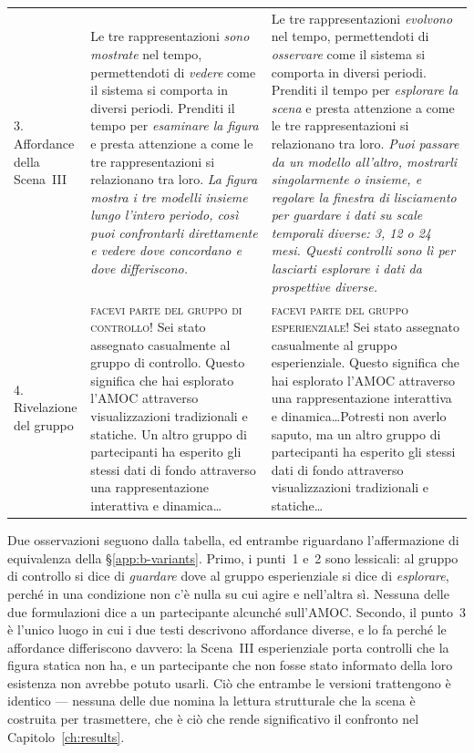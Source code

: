\begin{table}[tbp]
\begin{tabularx}{\textwidth}{@{}p{2.3cm} X X@{}}
\makecell[l]{3.\\Affordance\\della Scena~III} &
Le tre rappresentazioni \emph{sono mostrate} nel tempo, permettendoti di \emph{vedere} come il
sistema si comporta in diversi periodi. Prenditi il tempo per \emph{esaminare la figura} e presta
attenzione a come le tre rappresentazioni si relazionano tra loro. \emph{La figura mostra i tre
modelli insieme lungo l'intero periodo, così puoi confrontarli direttamente e vedere dove concordano
e dove differiscono.} &
Le tre rappresentazioni \emph{evolvono} nel tempo, permettendoti di \emph{osservare} come il sistema
si comporta in diversi periodi. Prenditi il tempo per \emph{esplorare la scena} e presta attenzione a
come le tre rappresentazioni si relazionano tra loro. \emph{Puoi passare da un modello all'altro,
mostrarli singolarmente o insieme, e regolare la finestra di lisciamento per guardare i dati su scale
temporali diverse: 3, 12 o 24 mesi. Questi controlli sono lì per lasciarti esplorare i dati da
prospettive diverse.} \\
\addlinespace

\makecell[l]{4.\\Rivelazione\\del gruppo} &
\textsc{facevi parte del gruppo di controllo!} Sei stato assegnato casualmente al gruppo di
controllo. Questo significa che hai esplorato l'AMOC attraverso visualizzazioni tradizionali e
statiche. Un altro gruppo di partecipanti ha esperito gli stessi dati di fondo attraverso una
rappresentazione interattiva e dinamica\dots &
\textsc{facevi parte del gruppo esperienziale!} Sei stato assegnato casualmente al gruppo
esperienziale. Questo significa che hai esplorato l'AMOC attraverso una rappresentazione interattiva
e dinamica\dots Potresti non averlo saputo, ma un altro gruppo di partecipanti ha esperito gli stessi
dati di fondo attraverso visualizzazioni tradizionali e statiche\dots \\

\bottomrule
\end{tabularx}
\end{table}

Due osservazioni seguono dalla tabella, ed entrambe riguardano l'affermazione di equivalenza della
\S\ref{app:b-variants}. Primo, i punti~1 e~2 sono lessicali: al gruppo di controllo si dice di
\emph{guardare} dove al gruppo esperienziale si dice di \emph{esplorare}, perché in una condizione
non c'è nulla su cui agire e nell'altra sì. Nessuna delle due formulazioni dice a un partecipante
alcunché sull'AMOC. Secondo, il punto~3 è l'unico luogo in cui i due testi descrivono affordance
diverse, e lo fa perché le affordance differiscono davvero: la Scena~III esperienziale porta
controlli che la figura statica non ha, e un partecipante che non fosse stato informato della loro
esistenza non avrebbe potuto usarli. Ciò che entrambe le versioni trattengono è identico --- nessuna
delle due nomina la lettura strutturale che la scena è costruita per trasmettere, che è ciò che rende
significativo il confronto nel Capitolo~\ref{ch:results}.

